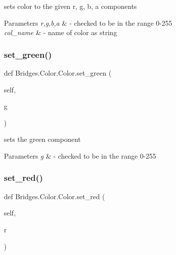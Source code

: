 sets color to the given r, g, b, a components 


\begin{DoxyParams}{Parameters}
{\em r,g,b,a} & -\/ checked to be in the range 0-\/255 \\
\hline
{\em col\+\_\+name} & -\/ name of color as string \\
\hline
\end{DoxyParams}
\mbox{\label{class_bridges_1_1_color_1_1_color_a6aa178a4f074320fd1da522d446585b8}} 
\subsubsection{\texorpdfstring{set\+\_\+green()}{set\_green()}}
{\footnotesize\ttfamily def Bridges.\+Color.\+Color.\+set\+\_\+green (\begin{DoxyParamCaption}\item[{}]{self,  }\item[{}]{g }\end{DoxyParamCaption})}



sets the green component 


\begin{DoxyParams}{Parameters}
{\em g} & -\/ checked to be in the range 0-\/255 \\
\hline
\end{DoxyParams}
\mbox{\label{class_bridges_1_1_color_1_1_color_a8e2c7504d49723b525e08d7518a5dcfd}} 
\subsubsection{\texorpdfstring{set\+\_\+red()}{set\_red()}}
{\footnotesize\ttfamily def Bridges.\+Color.\+Color.\+set\+\_\+red (\begin{DoxyParamCaption}\item[{}]{self,  }\item[{}]{r }\end{DoxyParamCaption})}



